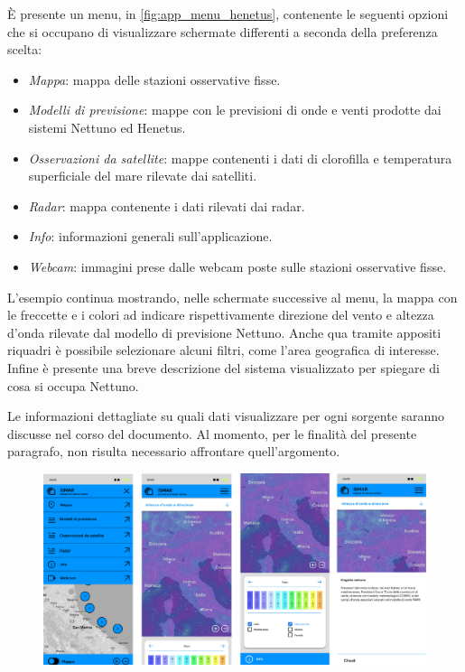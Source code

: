 \documentclass[./main.tex]{subfiles}
\begin{document}
È presente un menu, in \autoref{fig:app_menu_henetus}, contenente le seguenti opzioni che si occupano di visualizzare schermate differenti a seconda della preferenza scelta:
\begin{itemize}
    \item \textit{Mappa}: mappa delle stazioni osservative fisse.
    \item \textit{Modelli di previsione}: mappe con le previsioni di onde e venti prodotte dai sistemi Nettuno ed Henetus.
    \item \textit{Osservazioni da satellite}: mappe contenenti i dati di clorofilla e temperatura superficiale del mare rilevate dai satelliti.
    \item \textit{Radar}: mappa contenente i dati rilevati dai radar.
    \item \textit{Info}: informazioni generali sull'applicazione.
    \item \textit{Webcam}: immagini prese dalle webcam poste sulle stazioni osservative fisse.
\end{itemize}

L'esempio continua mostrando, nelle schermate successive al menu, la mappa con le freccette e i colori ad indicare rispettivamente direzione del vento e altezza d'onda rilevate dal modello di previsione Nettuno. Anche qua tramite appositi riquadri è possibile selezionare alcuni filtri, come l'area geografica di interesse. Infine è presente una breve descrizione del sistema visualizzato per spiegare di cosa si occupa Nettuno.

Le informazioni dettagliate su quali dati visualizzare per ogni sorgente saranno discusse nel corso del documento. Al momento, per le finalità del presente paragrafo, non risulta necessario affrontare quell'argomento.

\begin{figure}[!ht]
\noindent\begin{minipage}{\textwidth}
\vspace{1cm}
\includegraphics[width=\textwidth]{images/app_ismar_data_menu_nettuno.pdf}
\captionsetup{font=small, hypcap=false}
\label{fig:app_menu_henetus}
\end{minipage}
\vspace{0.25cm}
\end{figure}
\end{document}
